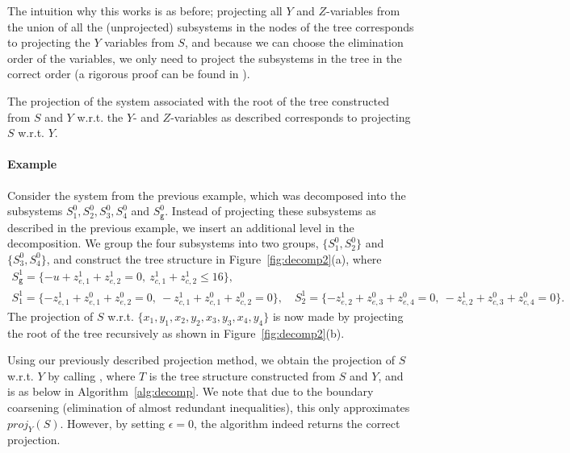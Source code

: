 \documentclass[citeauthoryear]{llncs}
\newcommand{\trt}[1]{\texttt{#1}}
\newcommand{\mi}{\mathit}
\begin{document}
The intuition why this works is as before; projecting all $Y$ and $Z$-variables from the union of all the (unprojected) subsystems in the nodes of the tree corresponds to projecting the $Y$ variables from $S$, and because we can choose the elimination order of the variables, we only need to project the subsystems in the tree in the correct order (a rigorous proof can be found in \cite{MyTechRep}).

\begin{proposition}
The projection of the system associated with the root of the tree constructed from $S$ and $Y$ w.r.t. the $Y$- and $Z$-variables as described corresponds to projecting $S$ w.r.t. $Y$.
\end{proposition}

\paragraph{Example}
Consider the system from the previous example, which was decomposed into the subsystems $S^0_1, S_2^0, S_3^0, S^0_4$ and $S^0_\trt{g}$. Instead of projecting these subsystems as described in the previous example, we insert an additional level in the decomposition. We group the four subsystems into two groups, $\{S^0_1, S^0_2\}$ and $\{S^0_3, S^0_4\}$, and construct the tree structure in Figure~\ref{fig:decomp2}(a), where 
\small{\begin{gather*}
S_\trt{g}^1 = \{-u + z^1_{e,1} + z^1_{e,2} = 0,\: z^1_{c,1} + z^1_{c,2} \leq 16 \},\\   
S^1_1=\{-z^1_{e,1} + z^0_{e,1} + z^0_{e,2} = 0,\: -z^1_{c,1} + z^0_{c,1} + z^0_{c,2} = 0\}, 
\quad S^1_2=\{-z^1_{e,2} +z^0_{e,3}+ z^0_{e,4} = 0,\: -z^1_{c,2} +z^0_{c,3}+ z^0_{c,4} = 0\}. 
\end{gather*}}
\normalsize{The projection of $S$ w.r.t. $\{x_1,y_1,x_2,y_2,x_3,y_3,x_4,y_4\}$ is now made by projecting the root of the tree recursively as shown in Figure~\ref{fig:decomp2}(b).}

Using our previously described projection method, we obtain the projection of $S$ w.r.t. $Y$ by calling , where $T$ is the tree structure constructed from $S$ and $Y$, and  is as below in Algorithm~\ref{alg:decomp}. We note that due to the boundary coarsening (elimination of almost redundant inequalities), this only approximates $\mi{proj}_Y(S)$. However, by setting $\epsilon = 0$, the algorithm indeed returns the correct projection.
\end{document}
